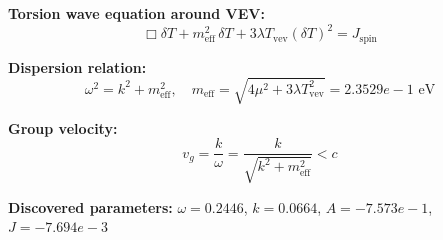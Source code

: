 
\textbf{Torsion wave equation around VEV:}
\begin{equation}
  \Box \delta T + m_{\text{eff}}^2 \, \delta T + 3\lambda T_{\text{vev}} (\delta T)^2 = J_{\text{spin}}
\end{equation}

\textbf{Dispersion relation:}
\begin{equation}
  \omega^2 = k^2 + m_{\text{eff}}^2, \quad
  m_{\text{eff}} = \sqrt{4\mu^2 + 3\lambda T_{\text{vev}}^2} = 2.3529e-1 \text{ eV}
\end{equation}

\textbf{Group velocity:}
\begin{equation}
  v_g = \frac{k}{\omega} = \frac{k}{\sqrt{k^2 + m_{\text{eff}}^2}} < c
\end{equation}

\textbf{Discovered parameters:}
$\omega = 0.2446$, \quad
$k = 0.0664$, \quad
$A = -7.573e-1$, \quad
$J = -7.694e-3$